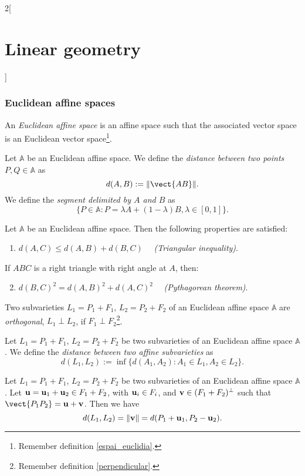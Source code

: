 \documentclass[../../../main.tex]{subfiles}
\begin{document}
\begin{multicols}{2}[\section{Linear geometry}]
  \subsubsection{Euclidean affine spaces}
  \begin{definition}
    An \textit{Euclidean affine space} is an affine space such that the associated vector space is an Euclidean vector space\footnote{Remember definition \ref{espai_euclidia}.}.
  \end{definition}
  \begin{definition}
    Let $\mathbb{A}$ be an Euclidean affine space. We define the \textit{distance between two points $P,Q\in\mathbb{A}$} as $$d(A,B):=\|\vect{AB}\|.$$ We define the \textit{segment delimited by $A$ and $B$} as $$\{P\in\mathbb{A}:P=\lambda A+(1-\lambda)B,\lambda\in[0,1]\}.$$
  \end{definition}
  \begin{prop}
    Let $\mathbb{A}$ be an Euclidean affine space. Then the following properties are satisfied:
    \begin{enumerate}
      \item $d(A,C)\leq d(A,B)+d(B,C)\quad$ \textit{(Triangular inequality)}.
    \end{enumerate}
    If $ABC$ is a right triangle with right angle at $A$, then:
    \begin{enumerate}
      \setcounter{enumi}{1}
      \item $d(B,C)^2=d(A,B)^2+d(A,C)^2\quad$ \textit{(Pythagorean theorem)}.
    \end{enumerate}
  \end{prop}
  \begin{definition}
    Two subvarieties $L_1=P_1+F_1$, $L_2=P_2+F_2$ of an Euclidean affine space $\mathbb{A}$ are \textit{orthogonal}, $L_1\perp L_2$, if $F_1\perp F_2$\footnote{Remember definition \ref{perpendicular}.}.
  \end{definition}
  \begin{definition}
    Let $L_1=P_1+F_1$, $L_2=P_2+F_2$ be two subvarieties of an Euclidean affine space $\mathbb{A}$. We define the \textit{distance between two affine subvarieties} as $$d(L_1,L_2):=\inf\{d(A_1,A_2):A_1\in L_1, A_2\in L_2\}.$$
  \end{definition}
  \begin{theorem}
    Let $L_1=P_1+F_1$, $L_2=P_2+F_2$ be two subvarieties of an Euclidean affine space $\mathbb{A}$. Let $\boldsymbol{\mathrm{u}}=\boldsymbol{\mathrm{u}}_1+\boldsymbol{\mathrm{u}}_2\in F_1+F_2$, with $\boldsymbol{\mathrm{u}}_i\in F_i$, and $\boldsymbol{\mathrm{v}}\in(F_1+F_2)^\perp$ such that $\vect{P_1P_2}=\vectorfunction{u}+\vectorfunction{v}$. Then we have $$d(L_1,L_2)=\|\boldsymbol{\mathrm{v}}\|=d(P_1+\boldsymbol{\mathrm{u}}_1,P_2-\boldsymbol{\mathrm{u}}_2).$$
  \end{theorem}

\end{multicols}
\end{document}
